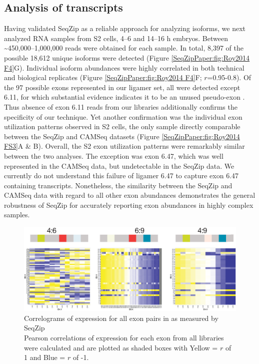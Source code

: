 	\subsection{Analysis of \dscam{} transcripts}
		\label{SeqZipPaper:subsec:SeqZip of endogenous Dscam}
	
		Having validated SeqZip as a reliable approach for analyzing \dscam{} isoforms, we next analyzed RNA samples from S2 cells, 4--6 and 14--16 h embryos. Between \textasciitilde 450,000--1,000,000 reads were obtained for each sample. In total, 8,397 of the possible 18,612 unique isoforms were detected (Figure \ref{SeqZipPaper:fig:Roy2014 F4}G). Individual isoform abundances were highly correlated in both technical and biological replicates (Figure \ref{SeqZipPaper:fig:Roy2014 F4}F; $r$=0.95-0.8). Of the 97 possible exons represented in our ligamer set, all were detected except 6.11, for which substantial evidence indicates it to be an unused pseudo-exon \citep{Neves2004,Zhan2004,Watson2005,Sun2013}. Thus absence of exon 6.11 reads from our libraries additionally confirms the specificity of our technique. Yet another confirmation was the individual exon utilization patterns observed in S2 cells, the only sample directly comparable between the SeqZip and CAMSeq datasets (Figure \ref{SeqZipPaper:fig:Roy2014 FS3}A \& B). Overall, the S2 exon utilization patterns were remarkably similar between the two analyses. The exception was exon 6.47, which was well represented in the CAMSeq data, but undetectable in the SeqZip data. We currently do not understand this failure of ligamer 6.47 to capture exon 6.47 containing transcripts. Nonetheless, the similarity between the SeqZip and CAMSeq data with regard to all other exon abundances demonstrates the general robustness of SeqZip for accurately reporting exon abundances in highly complex samples.

		\begin{figure} %
		  \centering 
		  \includegraphics{Figures/SeqZipPaper/Roy2014FigS4.eps}
		  \caption[Roy et al 2014 Figure S4]
		  {Correlograms of expression for all exon pairs in \dscam{} as measured by SeqZip\\[0.25cm]
		    Pearson correlations of expression for each exon from all libraries were calculated and are plotted as shaded boxes with Yellow = $r$ of 1 and Blue = $r$ of -1.
		    }
		  \label{SeqZipPaper:fig:Roy2014 S4}
		  \end{figure}

